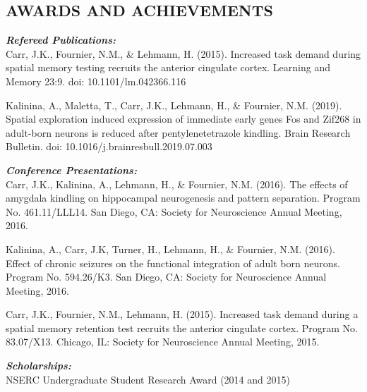 \documentclass[10pt]{res} %
\begin{document}
\begin{resume}
\section{AWARDS AND ACHIEVEMENTS}

\vspace{5mm}


{\sl \textbf{Refereed Publications:}}\\
Carr, J.K., Fournier, N.M., \& Lehmann, H. (2015). Increased task demand during spatial memory testing recruits the anterior cingulate cortex. Learning and Memory 23:9. doi:  10.1101/lm.042366.116


Kalinina, A., Maletta, T., Carr, J.K., Lehmann, H., \& Fournier, N.M. (2019). Spatial exploration induced expression of immediate early genes Fos and Zif268 in adult-born neurons is reduced after pentylenetetrazole kindling. Brain Research Bulletin. doi: 10.1016/j.brainresbull.2019.07.003

\vspace{5mm}
{\sl \textbf{Conference Presentations:}}\\
Carr, J.K., Kalinina, A., Lehmann, H., \& Fournier, N.M. (2016). The effects of amygdala kindling on hippocampal neurogenesis and pattern separation. Program No. 461.11/LLL14. San Diego, CA: Society for Neuroscience Annual Meeting, 2016.

Kalinina, A., Carr, J.K, Turner, H., Lehmann, H., \& Fournier, N.M. (2016). Effect of chronic seizures on the functional integration of adult born neurons. Program No. 594.26/K3. San Diego, CA: Society for Neuroscience Annual Meeting, 2016.

Carr, J.K., Fournier, N.M., Lehmann, H. (2015). Increased task demand during a spatial memory retention test recruits the anterior cingulate cortex. Program No. 83.07/X13. Chicago, IL: Society for Neuroscience Annual Meeting, 2015.

\vspace{5mm}

{\sl \textbf{Scholarships:}}\\
NSERC Undergraduate Student Research Award (2014 and 2015)


\end{resume}
\end{document}
